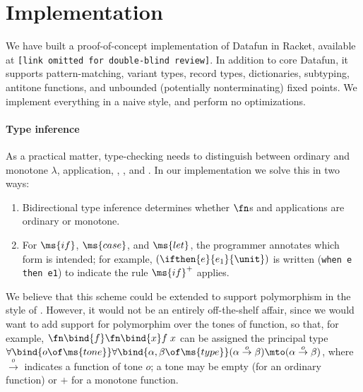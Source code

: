 \section{Implementation}
We have built a proof-of-concept implementation of Datafun in Racket, available
at \texttt{[link omitted for double-blind review]}. In addition to core Datafun,
it supports pattern-matching, variant types, record types, dictionaries,
subtyping, antitone functions, and unbounded (potentially nonterminating) fixed
points. We implement everything in a naive style, and perform no optimizations.

\paragraph{Type inference}
As a practical matter, type-checking needs to distinguish between ordinary and
monotone $\lambda$, application, , , and . In our
implementation we solve this in two ways:
\begin{enumerate}
\item Bidirectional type inference\cite{bidirectional} determines whether $\fn$s and
  applications are ordinary or monotone.
\item For $\ms{if}$, $\ms{case}$, and $\ms{let}$, the programmer annotates which
  form is intended; for example, $(\ifthen{e}{e_1}{\unit})$ is written
  (\texttt{when e then e1}) to indicate the rule $\ms{if}^+$ applies.
\end{enumerate}

We believe that this scheme could be extended to support polymorphism
in the style of \citet{dunfield-bidir}. However, it would not be an
entirely off-the-shelf affair, since we would want to add support for
polymorphim over the tones of function, so that, for example,
$\fn\bind{f}\fn\bind{x} f\;x$ can be assigned the principal type
$\forall\bind{o\of\ms{tone}}\forall\bind{\alpha,\beta \of \ms{type}}
(\alpha \overset{o}\to \beta) \mto (\alpha \overset{o}\to \beta)$,
where $\overset{o}\to$ indicates a function of tone $o$; a tone may be
empty (for an ordinary function) or ${+}$ for a monotone function.

% 
% 

